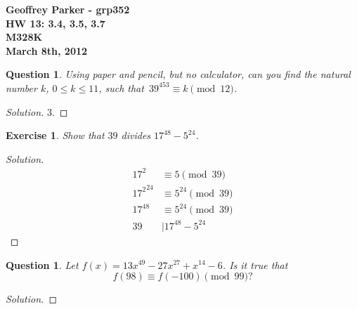 \documentclass[12pt,leqno]{article}
\numberwithin{equation}{section}
\newtheorem{exer}[thm]{Exercise}
\newtheorem{ques}[thm]{Question}
\theoremstyle{definition}
\begin{document}
\thispagestyle{plain}
\begin{flushright}
\large{\textbf{Geoffrey Parker - grp352 \\
HW 13: 3.4, 3.5, 3.7\\
M328K \\
March 8th, 2012 \\}}
\end{flushright}

\markboth{}{} \setcounter{section}{0} \baselineskip=18pt

\setcounter{tocdepth}{4}



\setcounter{section}{3}

\setcounter{thm}{3}

\begin{ques}
Using paper and pencil, but no calculator, can you find the natural
number $k$, $0 \leq k \leq 11$, such that~$39^{453} \equiv k
\pmod{12}$.
\end{ques}

\begin{proof}[Solution]
3.
\end{proof}

\begin{exer}
Show that $39$ divides $17^{48}-5^{24}$.
\end{exer}

\begin{proof}[Solution]
\begin{align*}
17^2 &\equiv 5 \pmod{39}\\
{17^2}^{24} &\equiv 5^{24} \pmod {39} \\
17^{48} &\equiv 5^{24} \pmod {39}\\
39 &\mid 17^{48}-5^{24}
\end{align*}
\end{proof}

\setcounter{thm}{6}

\begin{ques}
Let $f(x) = 13x^{49} - 27x^{27} + x^{14} - 6$.  Is it true that
\[f(98) \equiv f(-100) \pmod{99}?\]
\end{ques}

\begin{proof}[Solution]

\end{proof}
\end{document}
